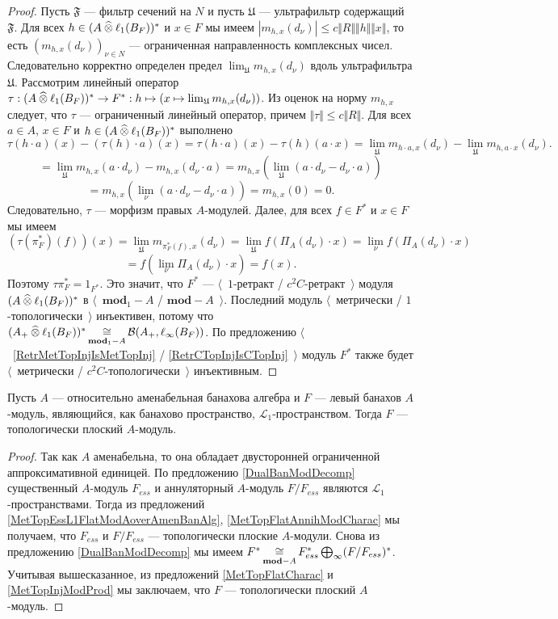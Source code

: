 \begin{proof}
Пусть $\mathfrak{F}$ --- фильтр сечений на $N$ и пусть $\mathfrak{U}$ --- ультрафильтр содержащий $\mathfrak{F}$. Для всех $h\in (A\mathbin{\widehat{\otimes}}\ell_1(B_F))^*$ и $x\in F$ мы имеем $|m_{h,x}(d_\nu)|\leq c\Vert R\Vert\Vert h\Vert\Vert x\Vert$, то есть $(m_{h,x}(d_\nu))_{\nu\in N}$ --- ограниченная направленность комплексных чисел. Следовательно корректно определен предел $\lim_{\mathfrak{U}}m_{h,x}(d_\nu)$ вдоль ультрафильтра $\mathfrak{U}$. Рассмотрим линейный оператор $\tau:(A\mathbin{\widehat{\otimes}}\ell_1(B_F))^*\to F^*:h\mapsto(x\mapsto\lim_{\mathfrak{U}}m_{h,x}(d_\nu))$. Из оценок на норму $m_{h,x}$ следует, что $\tau$ --- ограниченный линейный оператор, причем $\Vert\tau\Vert\leq c\Vert R\Vert$. Для всех $a\in A$, $x\in F$ и $h\in (A\mathbin{\widehat{\otimes}}\ell_1(B_F))^*$ выполнено
$$
\tau(h\cdot a)(x)-(\tau(h)\cdot a)(x)
=\tau(h\cdot a)(x)-\tau(h)(a\cdot x)
=\lim_{\mathfrak{U}}m_{h\cdot a,x}(d_\nu)-\lim_{\mathfrak{U}}m_{h,a\cdot x}(d_\nu).
$$
$$
=\lim_{\mathfrak{U}}m_{h,x}(a\cdot d_\nu)-m_{h,x}(d_\nu\cdot a)
=m_{h,x}\left(\lim_{\mathfrak{U}}(a\cdot d_\nu-d_\nu\cdot a)\right)
$$
$$
=m_{h,x}\left(\lim_{\nu}(a\cdot d_\nu-d_\nu\cdot a)\right)
=m_{h,x}(0)
=0.
$$
Следовательно, $\tau$ --- морфизм правых $A$-модулей. Далее, для всех $f\in F^*$ и $x\in F$ мы имеем
$$
(\tau(\pi_F^*)(f))(x)
=\lim_{\mathfrak{U}}m_{\pi_F^*(f),x}(d_\nu)
=\lim_{\mathfrak{U}}f(\Pi_A(d_\nu)\cdot x)
=\lim_{\nu}f(\Pi_A(d_\nu)\cdot x)
$$
$$
=f\left(\lim_{\nu}\Pi_A(d_\nu)\cdot x\right)
=f(x).
$$
Поэтому $\tau\pi_F^*=1_{F^*}$. Это значит, что $F^*$ --- $\langle$~$1$-ретракт / $c^2 C$-ретракт~$\rangle$ модуля $(A\mathbin{\widehat{\otimes}}\ell_1(B_F))^*$
 в $\langle$~$\mathbf{mod}_1-A$ / $\mathbf{mod}-A$~$\rangle$. Последний модуль $\langle$~метрически / $1$-топологически~$\rangle$ инъективен, потому что $(A_+\mathbin{\widehat{\otimes}}\ell_1(B_F))^*\mathop{\mathbin{\cong}}\limits_{\mathbf{mod}_1-A}\mathcal{B}(A_+,\ell_\infty(B_F))$. По предложению $\langle$~\ref{RetrMetTopInjIsMetTopInj} / \ref{RetrCTopInjIsCTopInj}~$\rangle$ модуль $F^*$ также будет $\langle$~метрически / $c^2 C$-топологически~$\rangle$ инъективным.
\end{proof}

\begin{theorem}\label{TopL1FlatModAoverAmenBanAlg} Пусть $A$ --- относительно аменабельная банахова алгебра и $F$ --- левый банахов $A$-модуль, являющийся, как банахово пространство, $\mathscr{L}_1$-пространством. Тогда $F$ --- топологически плоский $A$-модуль.
\end{theorem}
\begin{proof} Так как $A$ аменабельна, то она обладает двусторонней ограниченной аппроксимативной единицей. По предложению \ref{DualBanModDecomp} существенный $A$-модуль $F_{ess}$ и аннуляторный $A$-модуль $F/F_{ess}$ являются $\mathscr{L}_1$-пространствами. Тогда из предложений \ref{MetTopEssL1FlatModAoverAmenBanAlg}, \ref{MetTopFlatAnnihModCharac} мы получаем, что $F_{ess}$ и $F/F_{ess}$ --- топологически плоские $A$-модули. Снова из предложению \ref{DualBanModDecomp} мы имеем $F^*\mathop{\mathbin{\cong}}\limits_{\mathbf{mod}-A}F_{ess}^*\bigoplus_\infty (F/F_{ess})^*$. Учитывая вышесказанное, из предложений \ref{MetTopFlatCharac} и \ref{MetTopInjModProd} мы заключаем, что $F$ --- топологически плоский $A$-модуль.
\end{proof}

